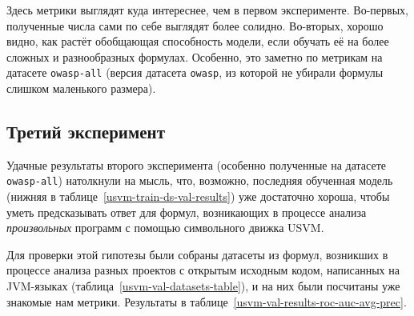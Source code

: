 Здесь метрики выглядят куда интереснее, чем в первом эксперименте. Во-первых, полученные числа сами по себе выглядят более солидно. Во-вторых, хорошо видно, как растёт обобщающая способность модели, если обучать её на более сложных и разнообразных формулах. Особенно, это заметно по метрикам на датасете \texttt{owasp-all} (версия датасета \texttt{owasp}, из которой не убирали формулы слишком маленького размера).

\subsection{Третий эксперимент}

Удачные результаты второго эксперимента (особенно полученные на датасете \texttt{owasp-all}) натолкнули на мысль, что, возможно, последняя обученная модель (нижняя в таблице~\ref{usvm-train-ds-val-results}) уже достаточно хороша, чтобы уметь предсказывать ответ для формул, возникающих в процессе анализа \textit{произвольных} программ с помощью символьного движка USVM.

Для проверки этой гипотезы были собраны датасеты из формул, возникших в процессе анализа разных проектов с открытым исходным кодом, написанных на JVM-языках (таблица~\ref{usvm-val-datasets-table}), и на них были посчитаны уже знакомые нам метрики. Результаты в таблице~\ref{usvm-val-results-roc-auc-avg-prec}.

